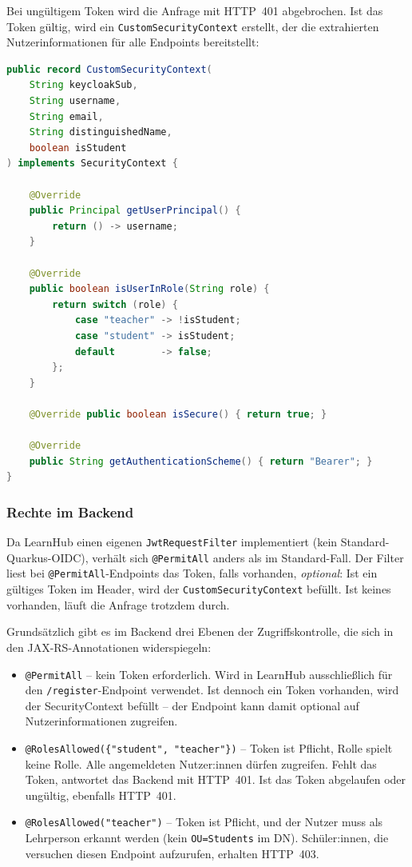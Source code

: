 Bei ungültigem Token wird die Anfrage mit HTTP~401 abgebrochen. Ist
das Token gültig, wird ein \texttt{CustomSecurityContext} erstellt,
der die extrahierten Nutzerinformationen für alle Endpoints
bereitstellt:

\begin{lstlisting}[language=Java,
                   caption={CustomSecurityContext (CustomSecurityContext.java)},
                   label={lst:custom-security-context}]
public record CustomSecurityContext(
    String keycloakSub,
    String username,
    String email,
    String distinguishedName,
    boolean isStudent
) implements SecurityContext {

    @Override
    public Principal getUserPrincipal() {
        return () -> username;
    }

    @Override
    public boolean isUserInRole(String role) {
        return switch (role) {
            case "teacher" -> !isStudent;
            case "student" -> isStudent;
            default        -> false;
        };
    }

    @Override public boolean isSecure() { return true; }

    @Override
    public String getAuthenticationScheme() { return "Bearer"; }
}
\end{lstlisting}

\subsubsection{Rechte im Backend}

Da LearnHub einen eigenen \texttt{JwtRequestFilter} implementiert (kein
Standard-Quarkus-OIDC), verhält sich \texttt{@PermitAll} anders als im
Standard-Fall. Der Filter liest bei \texttt{@PermitAll}-Endpoints das
Token, falls vorhanden, \textit{optional}: Ist ein gültiges Token im
Header, wird der \texttt{CustomSecurityContext} befüllt. Ist keines
vorhanden, läuft die Anfrage trotzdem durch.~\cite{quarkus-security-jwt}

Grundsätzlich gibt es im Backend drei Ebenen der Zugriffskontrolle,
die sich in den JAX-RS-Annotationen widerspiegeln:

\begin{itemize}
    \item \texttt{@PermitAll} -- kein Token erforderlich. Wird in
    LearnHub ausschließlich für den \texttt{/register}-Endpoint
    verwendet. Ist dennoch ein Token vorhanden, wird der
    SecurityContext befüllt -- der Endpoint kann damit optional
    auf Nutzerinformationen zugreifen.
    \item \texttt{@RolesAllowed(\{"{student}", "teacher"\})} -- Token
    ist Pflicht, Rolle spielt keine Rolle. Alle angemeldeten
    Nutzer:innen dürfen zugreifen. Fehlt das Token, antwortet
    das Backend mit HTTP~401. Ist das Token abgelaufen oder
    ungültig, ebenfalls HTTP~401.
    \item \texttt{@RolesAllowed("teacher")} -- Token ist Pflicht,
    und der Nutzer muss als Lehrperson erkannt werden (kein
    \texttt{OU=Students} im DN). Schüler:innen, die versuchen
    diesen Endpoint aufzurufen, erhalten HTTP~403.
\end{itemize}

